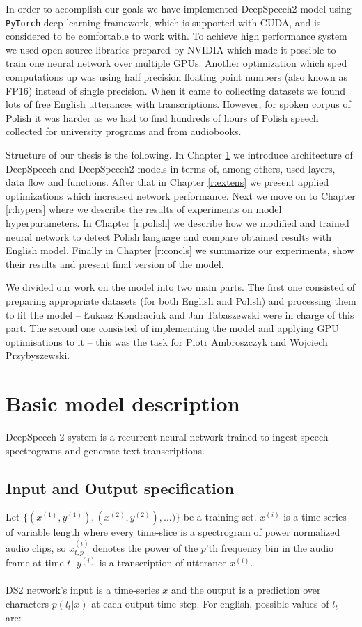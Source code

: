 \documentclass[licencjacka,en]{pracamgr}
\begin{document}
In order to accomplish our goals we have implemented DeepSpeech2 model using \texttt{PyTorch} deep learning framework, which is supported with CUDA, and is considered to be comfortable to work with. To achieve high performance system we used open-source libraries prepared by NVIDIA which made it possible to train one neural network over multiple GPUs. Another optimization which sped computations up was using half precision floating point numbers (also known as FP16) instead of single precision.  When it came to collecting datasets we found lots of free English utterances with transcriptions. However, for spoken corpus of Polish it was harder as we had to find hundreds of hours of Polish speech collected for university programs and from audiobooks.

Structure of our thesis is the following. In Chapter \ref{r:desc} we introduce architecture of DeepSpeech and DeepSpeech2 models in terms of, among others, used layers, data flow and functions. After that in Chapter \ref{r:extens} we present applied optimizations which increased network performance. Next we move on to Chapter \ref{r:hypers} where we describe the results of experiments on model hyperparameters. In Chapter \ref{r:polish} we describe how we modified and trained neural network to detect Polish language and compare obtained results with English model. Finally in Chapter \ref{r:concls} we summarize our experiments, show their results and present final version of the model.

We divided our work on the model into two main parts. The first one consisted of preparing appropriate datasets (for both English and Polish) and processing them to fit the model -- Łukasz Kondraciuk and Jan Tabaszewski were in charge of this part. The second one consisted of implementing the model and applying GPU optimisations to it -- this was the task for Piotr Ambroszczyk and Wojciech Przybyszewski.
\chapter{Basic model description}\label{r:desc}

DeepSpeech 2 system is a recurrent neural network trained to ingest speech spectrograms and generate text transcriptions.

\section{Input and Output specification}
Let $\{(x^{(1)}, y^{(1)}), (x^{(2)}, y^{(2)}), ...)\}$ be a training set. $x^{(i)}$ is a time-series of variable length where every time-slice is a spectrogram of power
normalized audio clips, so $x^{(i)}_{t,p}$ denotes the power of the $p$’th frequency bin in the audio frame at time $t$. $y^{(i)}$ is a transcription of utterance $x^{(i)}$.\\\\
DS2 network's input is a time-series $x$ and the output is a prediction over characters $p(l_t|x)$ at each output time-step. For english, possible values of $l_t$ are:
\end{document}
